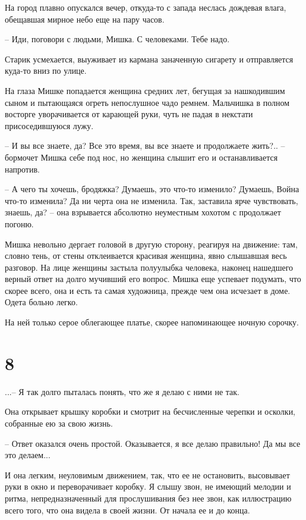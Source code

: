 \documentclass[a5paper]{article}
\begin{document}
На город плавно опускался вечер, откуда-то с запада неслась дождевая влага, обещавшая мирное небо еще на пару часов.

-- Иди, поговори с людьми, Мишка. С человеками. Тебе надо.

Старик усмехается, выуживает из кармана заначенную сигарету и отправляется куда-то вниз по улице.

На глаза Мишке попадается женщина средних лет, бегущая за нашкодившим сыном и пытающаяся огреть непослушное чадо ремнем. Мальчишка в полном восторге уворачивается от карающей руки, чуть не падая в некстати присоседившуюся лужу.

-- И вы все знаете, да? Все это время, вы все знаете и продолжаете жить?.. -- бормочет Мишка себе под нос, но женщина слышит его и останавливается напротив.

-- А чего ты хочешь, бродяжка? Думаешь, это что-то изменило? Думаешь, Война что-то изменила? Да ни черта она не изменила. Так, заставила ярче чувствовать, знаешь, да? -- она взрывается абсолютно неуместным хохотом с продолжает погоню.

Мишка невольно дергает головой в другую сторону, реагируя на движение: там, словно тень, от стены отклеивается красивая женщина, явно слышавшая весь разговор. На лице женщины застыла полуулыбка человека, наконец нашедшего верный ответ на долго мучивший его вопрос. Мишка еще успевает подумать, что скорее всего, она и есть та самая художница, прежде чем она исчезает в доме. Одета больно легко.

На ней только серое облегающее платье, скорее напоминающее ночную сорочку.

\section*{8}

...-- Я так долго пыталась понять, что же я делаю с ними не так.

Она открывает крышку коробки и смотрит на бесчисленные черепки и осколки, собранные ею за свою жизнь.

-- Ответ оказался очень простой. Оказывается, я все делаю правильно! Да мы все это делаем...

И она легким, неуловимым движением, так, что ее не остановить, высовывает руки в окно и переворачивает коробку. Я слышу звон, не имеющий мелодии и ритма, непредназначенный для прослушивания без нее звон, как иллюстрацию всего того, что она видела в своей жизни. От начала ее и до конца.
\end{document}
